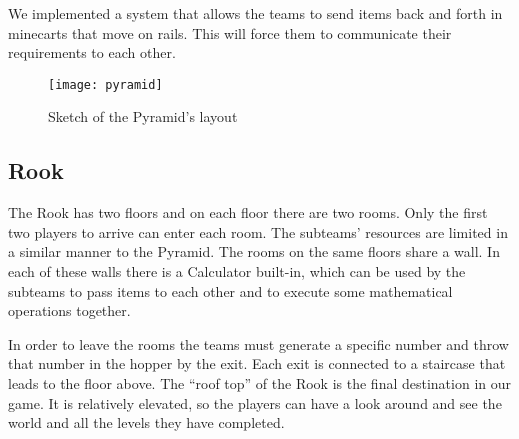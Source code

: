 We implemented a system that allows the teams to send items back and forth in minecarts that move on rails. This will force them to communicate their requirements to each other.

\begin{figure}[h!]
\label{fig:pyramid-layout}
\caption{Sketch of the Pyramid's layout}
\centering
\texttt{[image: pyramid]}
\end{figure}

\subsection{Rook}
The Rook has two floors and on each floor there are two rooms. Only the first two players to arrive can enter each room. The subteams’ resources are limited in a similar manner to the Pyramid. The rooms on the same floors share a wall. In each of these walls there is a Calculator built-in, which can be used by the subteams to pass items to each other and to execute some mathematical operations together.

In order to leave the rooms the teams must generate a specific number and throw that number in the hopper by the exit. Each exit is connected to a staircase that leads to the floor above. The “roof top” of the Rook is the final destination in our game. It is relatively elevated, so the players can have a look around and see the world and all the levels they have completed.
